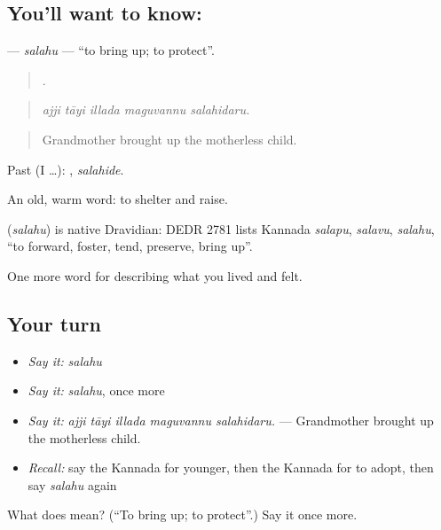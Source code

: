 \subsection*{You'll want to know: }
\textbf{} — \emph{salahu} — \textquotedblleft{}to bring up; to protect\textquotedblright{}.

\begin{quote}
    .
\end{quote}

\begin{quote}
\emph{ajji tāyi illada maguvannu salahidaru.}
\end{quote}

\begin{quote}
Grandmother brought up the motherless child.
\end{quote}

Past (I …): , \emph{salahide}.

An old, warm word: to shelter and raise.

\begin{cousinweb}
\textbf{} (\emph{salahu}) is native Dravidian: DEDR 2781 lists Kannada \emph{salapu}, \emph{salavu}, \emph{salahu}, \textquotedblleft{}to forward, foster, tend, preserve, bring up\textquotedblright{}.
\end{cousinweb}

\begin{grammarlens}[title={What you've built}]
One more word for describing what you lived and felt.
\end{grammarlens}

\subsection*{Your turn}
\begin{itemize}
\raggedright
  \item \emph{Say it:} \emph{salahu}
  \item \emph{Say it:} \emph{salahu}, once more
  \item \emph{Say it:} \emph{ajji tāyi illada maguvannu salahidaru.} — Grandmother brought up the motherless child.
  \item \emph{Recall:} say the Kannada for younger, then the Kannada for to adopt, then say \emph{salahu} again
\end{itemize}

\begin{tcolorbox}[breakable,colback=teal!4,colframe=teal!35!black,title={Before you move on}]
What does  mean? (\textquotedblleft{}To bring up; to protect\textquotedblright{}.) Say it once more.
\end{tcolorbox}
